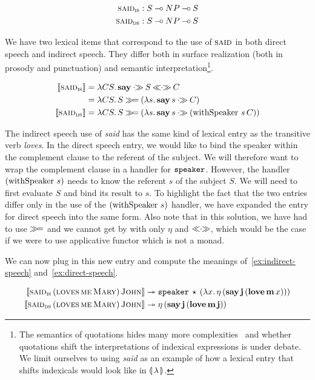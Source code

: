 \begin{align*}
  \textsc{said}_{\textsc{is}} &: S \mathbin{{-}\mkern-3.5mu{\circ}} NP \mathbin{{-}\mkern-3.5mu{\circ}} S \\
  \textsc{said}_{\textsc{ds}} &: S \mathbin{{-}\mkern-3.5mu{\circ}} NP \mathbin{{-}\mkern-3.5mu{\circ}} S
\end{align*}

We have two lexical items that correspond to the use of $\textsc{said}$ in
both direct speech and indirect speech. They differ both in surface
realization (both in prosody and punctuation) and semantic
interpretation\footnote{The semantics of quotations hides many more
  complexities~\cite{shan2010character} and whether quotations shift the
  interpretations of indexical expressions is under debate. We limit
  ourselves to using \emph{said} as an example of how a lexical entry that
  shifts indexicals would look like in ${\llparenthesis \, \lambda \, \rrparenthesis}$.}.

\begin{align*}
  \sem{\abs{said}_{\abs{is}}} &= \lam{C S}{\obj{say} \apr S \aplr C} \\
  &= \lam{C S}{S \hsbind (\lam{s}{\ap{\obj{say}}{s} \apr C})} \\
  \sem{\abs{said}_{\abs{ds}}}
  &= \lam{C S}{S \hsbind (\lam{s}{\ap{\obj{say}}{s} \apr (\app{\withSpeaker}{s}{C})})}
\end{align*}

The indirect speech use of \emph{said} has the same kind of lexical entry
as the transitive verb \emph{loves}. In the direct speech entry, we would
like to bind the speaker within the complement clause to the referent of
the subject. We will therefore want to wrap the complement clause in a
handler for $\mathtt{speaker}$. However, the handler $(\operatorname{withSpeaker}\,s)$
needs to know the referent $s$ of the subject $S$. We will need to first
evaluate $S$ and bind its result to $s$. To highlight the fact that the two
entries differ only in the use of the $(\operatorname{withSpeaker}\,s)$ handler, we
have expanded the entry for direct speech into the same form. Also note
that in this solution, we have had to use $\mathbin{\gg\!=}$ and we cannot get by
with only $\eta$ and $\mathbin{\ll\!\!\cdot\!\!\gg}$, which would be the case if we were to use
applicative functor which is not a monad.

We can now plug in this new entry and compute the meanings
of~\eqref{ex:indirect-speech} and~\eqref{ex:direct-speech}.

\NoChapterPrefix
\begin{align}
  \llbracket \textsc{said}_{\textsc{is}}\,(\textsc{loves}\,\textsc{me}\,\textsc{Mary})\,\textsc{John} \rrbracket
  & \twoheadrightarrow \mathtt{speaker}\,\star\,(\lambda x.\, \eta\,(\textbf{say}\,\textbf{j}\,(\textbf{love}\,\textbf{m}\,x))) \\
  \llbracket \textsc{said}_{\textsc{ds}}\,(\textsc{loves}\,\textsc{me}\,\textsc{Mary})\,\textsc{John} \rrbracket
  & \twoheadrightarrow \eta\,(\textbf{say}\,\textbf{j}\,(\textbf{love}\,\textbf{m}\,\textbf{j}))
\end{align}
\ChapterPrefix

